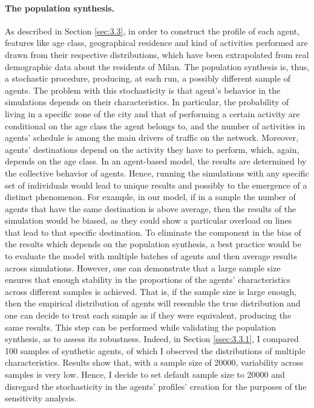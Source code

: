 \paragraph{The population synthesis.} 
As described in Section \ref{sec:3.3}, in order to construct the profile of each agent, features like age class, geographical residence and kind of activities performed are drawn from their respective distributions, which have been extrapolated from real demographic data about the residents of Milan. The population synthesis is, thus, a stochastic procedure, producing, at each run, a possibly different sample of agents. The problem with this stochasticity is that agent's behavior in the simulations depends on their characteristics. In particular, the probability of living in a specific zone of the city and that of performing a certain activity are conditional on the age class the agent belongs to, and the number of activities in agents' schedule is among the main drivers of traffic on the network. Moreover, agents' destinations depend on the activity they have to perform, which, again, depends on the age class. In an agent-based model, the results are determined by the collective behavior of agents. Hence, running the simulations with any specific set of individuals would lead to unique results and possibly to the emergence of a distinct phenomenon. For example, in our model, if in a sample the number of agents that have the same destination is above average, then the results of the simulation would be biased, as they could show a particular overload on lines that lead to that specific destination. To eliminate the component in the bias of the results which depends on the population synthesis, a best practice would be to evaluate the model with multiple batches of agents and then average results across simulations. However, one can demonstrate that a large sample size ensures that enough stability in the proportions of the agents' characteristics across different samples is achieved. That is, if the sample size is large enough, then the empirical distribution of agents will resemble the true distribution and one can decide to treat each sample as if they were equivalent, producing the same results. This step can be performed while validating the population synthesis, as to assess its robustness. Indeed, in Section \ref{ssec:3.3.1}, I compared 100 samples of synthetic agents, of which I observed the distributions of multiple characteristics. Results show that, with a sample size of 20000, variability across samples is very low. Hence, I decide to set default sample size to 20000 and disregard the stochasticity in the agents' profiles' creation for the purposes of the sensitivity analysis.

